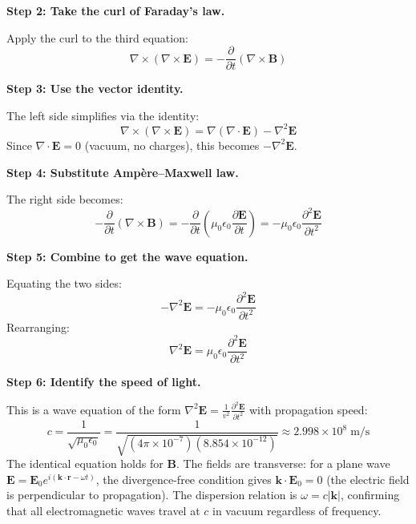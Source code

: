 \textbf{Step 2: Take the curl of Faraday's law.}

Apply the curl to the third equation:
\begin{equation}
\nabla \times (\nabla \times \mathbf{E}) = -\frac{\partial}{\partial t}(\nabla \times \mathbf{B})
\end{equation}

\textbf{Step 3: Use the vector identity.}

The left side simplifies via the identity:
\begin{equation}
\nabla \times (\nabla \times \mathbf{E}) = \nabla(\nabla \cdot \mathbf{E}) - \nabla^2 \mathbf{E}
\end{equation}
Since $\nabla \cdot \mathbf{E} = 0$ (vacuum, no charges), this becomes $-\nabla^2 \mathbf{E}$.

\textbf{Step 4: Substitute Amp\`ere--Maxwell law.}

The right side becomes:
\begin{equation}
-\frac{\partial}{\partial t}(\nabla \times \mathbf{B}) = -\frac{\partial}{\partial t}\left(\mu_0\epsilon_0\frac{\partial \mathbf{E}}{\partial t}\right) = -\mu_0\epsilon_0\frac{\partial^2 \mathbf{E}}{\partial t^2}
\end{equation}

\textbf{Step 5: Combine to get the wave equation.}

Equating the two sides:
\begin{equation}
-\nabla^2 \mathbf{E} = -\mu_0\epsilon_0\frac{\partial^2 \mathbf{E}}{\partial t^2}
\end{equation}
Rearranging:
\begin{equation}
\boxed{\nabla^2 \mathbf{E} = \mu_0\epsilon_0\frac{\partial^2 \mathbf{E}}{\partial t^2}}
\end{equation}

\textbf{Step 6: Identify the speed of light.}

This is a wave equation of the form $\nabla^2 \mathbf{E} = \frac{1}{v^2}\frac{\partial^2 \mathbf{E}}{\partial t^2}$ with propagation speed:
\begin{equation}
c = \frac{1}{\sqrt{\mu_0\epsilon_0}} = \frac{1}{\sqrt{(4\pi \times 10^{-7})(8.854 \times 10^{-12})}} \approx 2.998 \times 10^8 \;\text{m/s}
\end{equation}
The identical equation holds for $\mathbf{B}$. The fields are transverse: for a plane wave $\mathbf{E} = \mathbf{E}_0 e^{i(\mathbf{k}\cdot\mathbf{r} - \omega t)}$, the divergence-free condition gives $\mathbf{k} \cdot \mathbf{E}_0 = 0$ (the electric field is perpendicular to propagation). The dispersion relation is $\omega = c|\mathbf{k}|$, confirming that all electromagnetic waves travel at $c$ in vacuum regardless of frequency.

